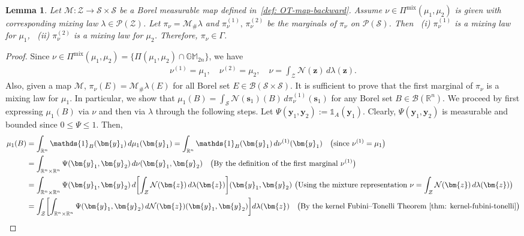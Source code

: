 \documentclass[opre,sglanonrev]{informs4}
\newtheorem{lemma}{Lemma}
\newcommand{\mZ}{\mathcal{Z}}
\newcommand{\mS}{\mathcal{S}}
\newcommand{\mN}{\mathcal{N}}
\newcommand{\mM}{\mathcal{M}}
\newcommand{\mP}{\mathcal{P}}
\newcommand{\mB}{\mathcal{B}}
\newcommand{\mbR}{\mathbb R}
\newcommand{\mbGM}{\mathbb{GM}}
\newcommand{\ind}{\mathds{1}}
\newcommand{\bs}{\bm{s}}
\newcommand{\by}{\bm{y}}
\newcommand{\bz}{\bm{z}}
\begin{document}
\begin{lemma}\label{lem: Gamma-mixture-to-joint-gauss}
Let $\mM : \mZ \to \mS \times \mS$ be a Borel measurable map defined in~\eqref{def: OT-map-backward}. Assume $\nu \in \Pi^\mathrm{mix}(\mu_1, \mu_2)$ is given with corresponding mixing law $\lambda \in \mP(\mZ)$. Let $\pi_\nu = \mM_\# \lambda$ and $\pi_\nu^{(1)}, \, \pi_\nu^{(2)}$ be the marginals of $\pi_\nu$ on $\mP(\mS)$. Then \, (i) $\pi_\nu^{(1)}$ is a mixing law for $\mu_1$, \, (ii) $\pi_\nu^{(2)}$ is a mixing law for $\mu_2$.
Therefore, $\pi_\nu \in \Gamma$.
\end{lemma}

\begin{proof}
Since $\nu \in \Pi^\mathrm{mix}(\mu_1, \mu_2) = \{\Pi(\mu_1, \mu_2) \cap \mbGM_{2n}\}$, we have
\begin{align}\label{eq: given-identity}
 \nu^{(1)} = \mu_1, \quad \nu^{(2)} = \mu_2, \quad \nu = \int_\mZ \mN(\bz)\,d\lambda(\bz).     
\end{align}
Also, given a map $\mM$, $\pi_\nu(E) = \mM_{\#} \lambda(E)$ for all Borel set $E \in \mB(\mS \times \mS)$. It is sufficient to prove that the first marginal of $\pi_\nu$ is a mixing law for $\mu_1$.  In particular, we show that $   \mu_1(B)
= \int_{\mathcal{S}} \mN(\bs_1)(B)\,d\pi_\nu^{(1)}(\bs_1)$ for any Borel set $B\in \mB(\mbR^n)$. We proceed by first expressing $\mu_1(B)$ via $\nu$ and then via $\lambda$ through the following steps. Let $\Psi(\by_1,\by_2) :=\ind_A(\by_1)$. Clearly, $\Psi(\by_1,\by_2)$ is measurable and bounded since $0 \leq \Psi\leq 1$. Then, 
\begin{align}
       \mu_1(B)
   & =
   \int_{\mbR^n} \ind_B(\by_1)\,d\mu_1(\by_1) =
   \int_{\mbR^n} \ind_B(\by_1)\,d\nu^{(1)}(\by_1) \quad \text{\big(since $\nu^{(1)} = \mu_1$\big)} \nonumber\\
   & =
   \int_{\mbR^n\times\mbR^n} \Psi(\by_1,\by_2)\,d\nu(\by_1,\by_2) \quad \text{\big(By the definition of the first marginal $\nu^{(1)}$\big)} \nonumber\\
   & =\int_{\mbR^n\times\mbR^n} \Psi(\by_1,\by_2)\,d\biggl[ \int_{\mZ} \mN(\bz)\,d\lambda(\bz)\biggr](\by_1,\by_2) \, \, \text{\big(Using the mixture representation $\nu = \displaystyle\int_{\mZ} \mN(\bz)\,d\lambda(\bz)$\big)} \nonumber\\
&=  \int_{\mZ}
      \biggl[        \int_{\mbR^n\times\mbR^n} \Psi(\by_1,\by_2)\,d\mN(\bz)(\by_1,\by_2)
      \biggr]
   d\lambda(\bz) \quad \text{\big(By the kernel Fubini--Tonelli Theorem~\ref{thm: kernel-fubini-tonelli}\big)} \nonumber\\

\end{align}
\end{proof}
\end{document}
